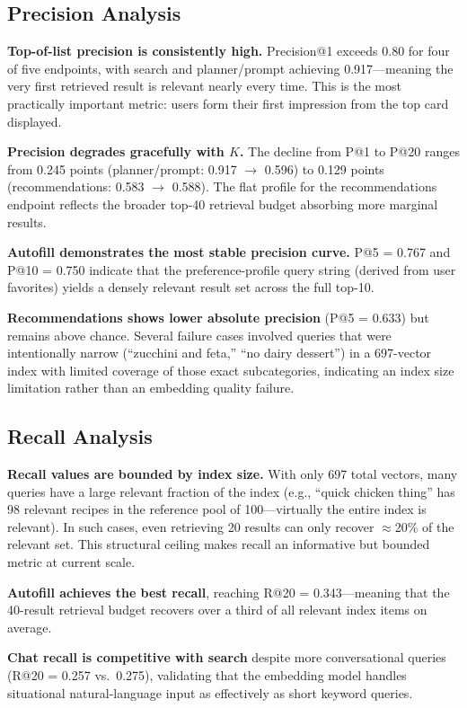 \documentclass[12pt,letterpaper]{article}
\begin{document}
\subsection{Precision Analysis}

\textbf{Top-of-list precision is consistently high.} Precision@1 exceeds 0.80 for four of
five endpoints, with search and planner/prompt achieving 0.917---meaning the very first
retrieved result is relevant nearly every time. This is the most practically important metric:
users form their first impression from the top card displayed.

\textbf{Precision degrades gracefully with $K$.} The decline from P@1 to P@20 ranges
from 0.245 points (planner/prompt: 0.917 $\to$ 0.596) to 0.129 points (recommendations:
0.583 $\to$ 0.588). The flat profile for the recommendations endpoint reflects the broader
top-40 retrieval budget absorbing more marginal results.

\textbf{Autofill demonstrates the most stable precision curve.} P@5 = 0.767 and
P@10 = 0.750 indicate that the preference-profile query string (derived from user favorites)
yields a densely relevant result set across the full top-10.

\textbf{Recommendations shows lower absolute precision} (P@5 = 0.633) but remains above
chance. Several failure cases involved queries that were intentionally narrow (``zucchini
and feta,'' ``no dairy dessert'') in a 697-vector index with limited coverage of those
exact subcategories, indicating an index size limitation rather than an embedding quality
failure.

\subsection{Recall Analysis}

\textbf{Recall values are bounded by index size.} With only 697 total vectors, many
queries have a large relevant fraction of the index (e.g., ``quick chicken thing'' has 98
relevant recipes in the reference pool of 100---virtually the entire index is relevant). In
such cases, even retrieving 20 results can only recover $\approx$20\% of the relevant set.
This structural ceiling makes recall an informative but bounded metric at current scale.

\textbf{Autofill achieves the best recall}, reaching R@20 = 0.343---meaning that the
40-result retrieval budget recovers over a third of all relevant index items on average.

\textbf{Chat recall is competitive with search} despite more conversational queries
(R@20 = 0.257 vs.\ 0.275), validating that the embedding model handles situational
natural-language input as effectively as short keyword queries.
\end{document}
